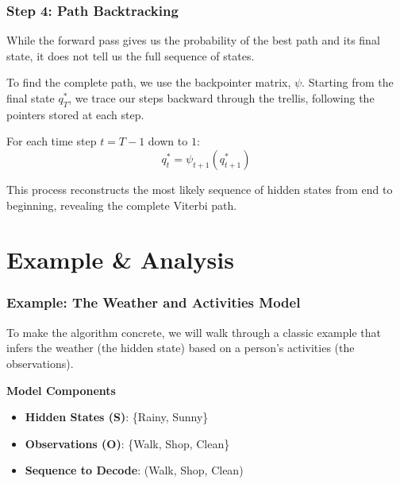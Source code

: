 \documentclass[aspectratio=43, 9pt]{beamer}
\begin{document}
\begin{frame}
    \frametitle{Step 4: Path Backtracking}
    While the forward pass gives us the probability of the best path and its final state, it does not tell us the full sequence of states.
    
    \vspace{1em}
    
    To find the complete path, we use the backpointer matrix, $\psi$. Starting from the final state $q_T^*$, we trace our steps backward through the trellis, following the pointers stored at each step.
    
    \begin{NewTheorem}
        For each time step $t = T-1$ down to $1$:
        $$q_t^* = \psi_{t+1}(q_{t+1}^*)$$
    \end{NewTheorem}
    
    \vspace{1em}
    
    This process reconstructs the most likely sequence of hidden states from end to beginning, revealing the complete Viterbi path.
\end{frame}

\section{Example \& Analysis}

\begin{frame}
    \frametitle{Example: The Weather and Activities Model}
    To make the algorithm concrete, we will walk through a classic example that infers the weather (the hidden state) based on a person's activities (the observations).

    \vspace{1em}
    
    \begin{NewDefinition}
        \textbf{Model Components}
        \begin{itemize}
            \item \textbf{Hidden States (S)}: \{Rainy, Sunny\}
            \item \textbf{Observations (O)}: \{Walk, Shop, Clean\}
            \item \textbf{Sequence to Decode}: (Walk, Shop, Clean)
        \end{itemize}
    \end{NewDefinition}
\end{frame}
\end{document}
